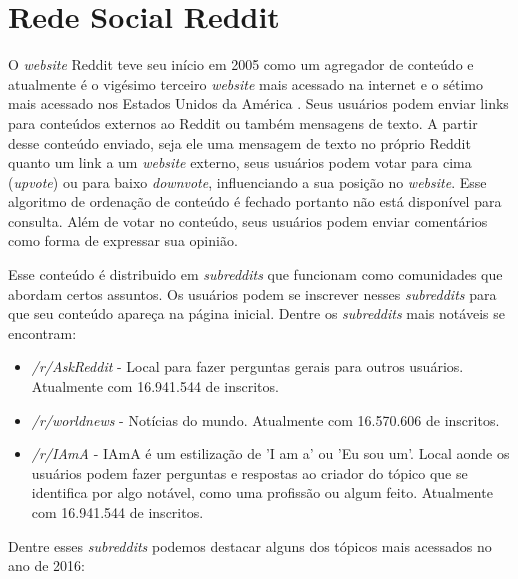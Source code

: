 \chapter{Rede Social Reddit}
\label{cap:Reddit}

O \textit{website} Reddit teve seu início em 2005 como um agregador de
conteúdo e atualmente é o vigésimo terceiro \textit{website} mais acessado na
internet e o sétimo mais acessado nos Estados Unidos da América \cite{alexa}. Seus usuários podem enviar links para conteúdos externos
ao Reddit ou também mensagens de texto. A partir desse conteúdo enviado, seja
ele uma mensagem de texto no próprio Reddit quanto um link a um \textit{website}
externo, seus usuários podem votar para cima (\textit{upvote}) ou para baixo
\textit{downvote}, influenciando a sua posição no \textit{website}. Esse
algoritmo de ordenação de conteúdo é fechado portanto não está disponível para
consulta. Além de votar no conteúdo, seus usuários podem enviar comentários como
forma de expressar sua opinião.

Esse conteúdo é distribuido em \textit{subreddits} que funcionam como
comunidades que abordam certos assuntos. Os usuários podem se inscrever nesses
\textit{subreddits} para que seu conteúdo apareça na página inicial. Dentre os
\textit{subreddits} mais notáveis se encontram:


\begin{itemize}
  \item \textit{/r/AskReddit} - Local para fazer perguntas gerais para outros
  usuários. Atualmente com 16.941.544 de inscritos.
  \item \textit{/r/worldnews} - Notícias do mundo. Atualmente com 16.570.606 de
  inscritos.
  \item \textit{/r/IAmA} - IAmA é um estilização de 'I am a' ou 'Eu sou um'.
  Local aonde os usuários podem fazer perguntas e respostas ao criador do
  tópico que se identifica por algo notável, como uma profissão ou algum feito.
  Atualmente com 16.941.544 de inscritos.
\end{itemize}

Dentre esses \textit{subreddits} podemos destacar alguns dos tópicos mais
acessados no ano de 2016:

